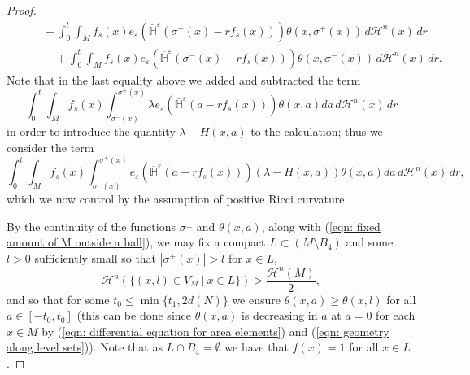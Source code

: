 \documentclass[11pt]{article}
\begin{document}
\begin{proof}
\begin{align*}
    &\quad\quad -\int_0^t\int_M f_s(x) e_\varepsilon\left(\overline{\mathbb{H}}^\varepsilon(\sigma^+(x) - rf_s(x))\right)\theta(x,\sigma^+(x)) \, d\mathcal{H}^n(x)\,dr\\
    &\quad\quad\quad +\int_0^t\int_M f_s(x) e_\varepsilon\left(\overline{\mathbb{H}}^\varepsilon(\sigma^-(x) - rf_s(x))\right)\theta(x,\sigma^-(x)) \, d\mathcal{H}^n(x)\,dr.
\end{align*}
Note that in the last equality above we added and subtracted the term 
\begin{equation*}
    \int_0^t \int_M f_s(x) \int_{\sigma^-(x)}^{\sigma^+(x)} \lambda e_\varepsilon(\overline{\mathbb{H}}^\varepsilon(a - rf_s(x)))\theta(x,a) da \, d\mathcal{H}^n(x) \, dr
\end{equation*}
in order to introduce the quantity $\lambda - H(x,a)$ to the calculation; thus we consider the term
\begin{equation}\label{eqn: underlying geometry term}
    \int_0^t \int_M f_s(x) \int_{\sigma^-(x)}^{\sigma^+(x)} e_\varepsilon(\overline{\mathbb{H}}^\varepsilon(a - rf_s(x)))(\lambda - H(x,a))\theta(x,a) da \, d\mathcal{H}^n(x) \, dr , 
\end{equation}
which we now control by the assumption of positive Ricci curvature.

\bigskip

By the continuity of the functions $\sigma^\pm$ and $\theta(x,a)$, along with (\ref{eqn: fixed amount of M outside a ball}), we may fix a compact $L \subset (M \setminus B_4)$ and some $l > 0$ sufficiently small so that $|\sigma^\pm(x)| > l$ for $x \in L$,
\begin{equation}\label{eqn: fixed area for energy drop}
    \mathcal{H}^n(\{ (x,l) \in V_M \: | \: x \in L\}) > \frac{\mathcal{H}^n(M)}{2},
\end{equation} 
and so that for some $t_0 \leq \min \{t_1,2d(N)\}$ we ensure $\theta(x,a) \geq \theta(x,l)$ for all $a \in [-t_0,t_0]$ (this can be done since $\theta(x,a)$ is decreasing in $a$ at $a = 0$ for each $x \in M$ by (\ref{eqn: differential equation for area elements}) and (\ref{eqn: geometry along level sets})). Note that as $L \cap B_4 = \emptyset$ we have that $f(x) = 1$ for all $x \in L$.

\bigskip


\end{proof}
\end{document}
